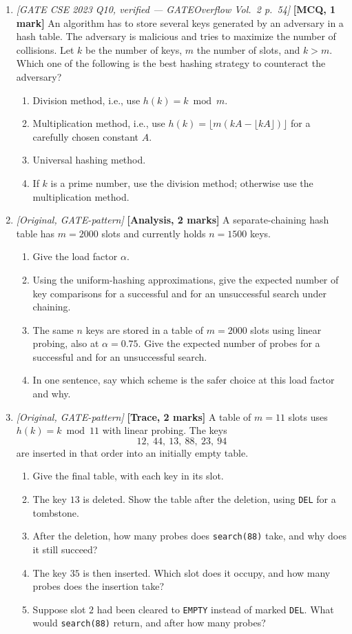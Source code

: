 \documentclass[11pt]{article}
\begin{document}
\begin{enumerate}
\item[\textbf{Q6}] \textit{[GATE CSE 2023 Q10, verified --- GATEOverflow Vol.~2 p.~54]} \textbf{[MCQ, 1 mark]} An algorithm has to store several keys generated by an adversary in a hash table. The adversary is malicious and tries to maximize the number of collisions. Let $k$ be the number of keys, $m$ the number of slots, and $k>m$. Which one of the following is the best hashing strategy to counteract the adversary?
\begin{enumerate}
  \item[(A)] Division method, i.e., use $h(k)=k \bmod m$.
  \item[(B)] Multiplication method, i.e., use $h(k)=\lfloor m(kA-\lfloor kA\rfloor)\rfloor$ for a carefully chosen constant $A$.
  \item[(C)] Universal hashing method.
  \item[(D)] If $k$ is a prime number, use the division method; otherwise use the multiplication method.
\end{enumerate}

\item[\textbf{Q7}] \textit{[Original, GATE-pattern]} \textbf{[Analysis, 2 marks]} A separate-chaining hash table has $m=2000$ slots and currently holds $n=1500$ keys.
\begin{enumerate}
  \item[(a)] Give the load factor $\alpha$.
  \item[(b)] Using the uniform-hashing approximations, give the expected number of key comparisons for a successful and for an unsuccessful search under chaining.
  \item[(c)] The same $n$ keys are stored in a table of $m=2000$ slots using linear probing, also at $\alpha=0.75$. Give the expected number of probes for a successful and for an unsuccessful search.
  \item[(d)] In one sentence, say which scheme is the safer choice at this load factor and why.
\end{enumerate}

\item[\textbf{Q8}] \textit{[Original, GATE-pattern]} \textbf{[Trace, 2 marks]} A table of $m=11$ slots uses $h(k)=k \bmod 11$ with linear probing. The keys
\[
12,\ 44,\ 13,\ 88,\ 23,\ 94
\]
are inserted in that order into an initially empty table.
\begin{enumerate}
  \item[(a)] Give the final table, with each key in its slot.
  \item[(b)] The key $13$ is deleted. Show the table after the deletion, using \texttt{DEL} for a tombstone.
  \item[(c)] After the deletion, how many probes does \texttt{search(88)} take, and why does it still succeed?
  \item[(d)] The key $35$ is then inserted. Which slot does it occupy, and how many probes does the insertion take?
  \item[(e)] Suppose slot $2$ had been cleared to \texttt{EMPTY} instead of marked \texttt{DEL}. What would \texttt{search(88)} return, and after how many probes?
\end{enumerate}


\end{enumerate}
\end{document}
